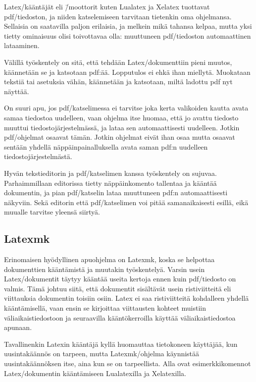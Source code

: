Latex\-/kääntäjät eli \=/moottorit kuten Lualatex ja Xelatex tuottavat
pdf\-/tiedoston, ja niiden katselemiseen tarvitaan tietenkin oma
ohjelmansa. Sellaisia on saatavilla paljon erilaisia, ja melkein mikä
tahansa kelpaa, mutta yksi tietty ominaisuus olisi toivottavaa olla:
muuttuneen pdf\-/tiedoston automaattinen lataaminen.

Välillä työskentely on sitä, että tehdään Latex\-/dokumenttiin pieni
muutos, käännetään se ja katsotaan pdf:ää. Lopputulos ei ehkä ihan
miellytä. Muokataan tekstiä tai asetuksia vähän, käännetään ja
katsotaan, miltä ladottu pdf nyt näyttää.

On suuri apu, jos pdf\-/katselimessa ei tarvitse joka kerta valikoiden
kautta avata samaa tiedostoa uudelleen, vaan ohjelma itse huomaa, että
jo avattu tiedosto muuttui tiedostojärjestelmässä, ja lataa sen
automaattisesti uudelleen. Jotkin pdf\-/ohjelmat osaavat tämän. Jotkin
ohjelmat eivät ihan osaa mutta osaavat sentään yhdellä
näppäinpainalluksella avata saman pdf:n uudelleen
tiedostojärjestelmästä.

Hyvän tekstieditorin ja pdf\-/katselimen kanssa työskentely on sujuvaa.
Parhaimmillaan editorissa tietty näppäinkomento tallentaa ja kääntää
dokumentin, ja pian pdf\-/katselin lataa muuttuneen pdf:n
automaattisesti näkyviin. Sekä editorin että pdf\-/katselimen voi pitää
sa\-man\-aikai\-ses\-ti esillä, eikä muualle tarvitse yleensä siirtyä.

\subsection{Latexmk}
\label{luku:latexmk}

Erin\-omaisen hyödyllinen apu\-ohjelma on Latexmk, koska se helpottaa
dokumenttien kääntämistä ja muutakin työskentelyä. Varsin usein
Latex\-/dokumentit täytyy kääntää useita kertoja ennen kuin
pdf\-/tiedosto on valmis. Tämä johtuu siitä, että dokumentit sisältävät
usein ristiviitteitä eli viittauksia dokumentin toisiin osiin. Latex ei
saa ristiviitteitä kohdalleen yhdellä kääntämisellä, vaan ensin se
kirjoittaa viittausten kohteet muistiin väliaikaistiedostoon ja
seuraavilla kääntökerroilla käyttää väliaikaistiedostoa apunaan.

Tavallinenkin Latexin kääntäjä kyllä huomauttaa tietokoneen käyttäjää,
kun uusintakäännös on tarpeen, mutta Latexmk\-/ohjelma käynnistää
uusintakäännöksen itse, aina kun se on tarpeellista. Alla ovat
esimerkkikomennot Latex\-/dokumentin kääntämiseen Lualatexilla ja
Xelatexilla.

